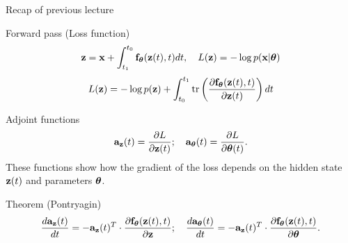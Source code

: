 \begin{frame}{Recap of previous lecture}
	\begin{block}{Forward pass (Loss function)}
		\vspace{-0.3cm}
		\[
			\mathbf{z} = \mathbf{x} + \int_{t_1}^{t_0} \mathbf{f}_{\boldsymbol{\theta}}(\mathbf{z}(t), t) dt, \quad L(\mathbf{z}) = - \log p(\mathbf{x} | \boldsymbol{\theta})
		\]
		\[
			L(\mathbf{z}) = - \log p(\mathbf{z}) + \int_{t_0}^{t_1} \text{tr} \left( \frac{\partial \mathbf{f}_{\boldsymbol{\theta}}(\mathbf{z}(t), t)}{\partial \mathbf{z}(t)} \right) dt
		\]
		\vspace{-0.5cm}
	\end{block}
	\begin{block}{Adjoint functions}
		\vspace{-0.4cm}
		\[
			\mathbf{a}_{\mathbf{z}}(t) = \frac{\partial L}{\partial \mathbf{z}(t)}; \quad \mathbf{a}_{\boldsymbol{\theta}}(t) = \frac{\partial L}{\partial \boldsymbol{\theta}(t)}.
		\]
		These functions show how the gradient of the loss depends on the hidden state~$\mathbf{z}(t)$ and parameters $\boldsymbol{\theta}$.
		\vspace{-0.3cm}
	\end{block}

	\begin{block}{Theorem (Pontryagin)}
		\vspace{-0.6cm}
		\[
		\frac{d \mathbf{a}_{\mathbf{z}}(t)}{dt} = - \mathbf{a}_{\mathbf{z}}(t)^T \cdot \frac{\partial \mathbf{f}_{\boldsymbol{\theta}}(\mathbf{z}(t), t)}{\partial \mathbf{z}}; \quad \frac{d \mathbf{a}_{\boldsymbol{\theta}}(t)}{dt} = - \mathbf{a}_{\mathbf{z}}(t)^T \cdot \frac{\partial \mathbf{f}_{\boldsymbol{\theta}}(\mathbf{z}(t),  t)}{\partial \boldsymbol{\theta}}.
		\]
		\vspace{-0.7cm}
	\end{block}

\end{frame}
